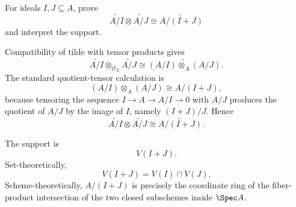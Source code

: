 \begin{problem}\label{prob:vi33-07}
For ideals \(I,J\subseteq A\), prove
\[
\widetilde{A/I}\otimes\widetilde{A/J}
\cong
\widetilde{A/(I+J)}
\]
and interpret the support.
\end{problem}

\ifdefined\FullProblemDossiers
\begin{solution}
Compatibility of tilde with tensor products gives
\[
\widetilde{A/I}\otimes_{\mathcal O_X}\widetilde{A/J}
\cong
\widetilde{(A/I)\otimes_A(A/J)}.
\]
The standard quotient-tensor calculation is
\[
(A/I)\otimes_A(A/J)
\cong
A/(I+J),
\]
because tensoring the sequence \(I\to A\to A/I\to0\) with \(A/J\) produces the quotient of \(A/J\) by the image
of \(I\), namely \((I+J)/J\). Hence
\[
\boxed{
\widetilde{A/I}\otimes\widetilde{A/J}
\cong
\widetilde{A/(I+J)}.
}
\]

The support is
\[
V(I+J).
\]
Set-theoretically,
\[
V(I+J)=V(I)\cap V(J).
\]
Scheme-theoretically, \(A/(I+J)\) is precisely the coordinate ring of the fiber-product intersection of the two
closed subschemes inside \(\Spec A\).
\end{solution}
\fi
